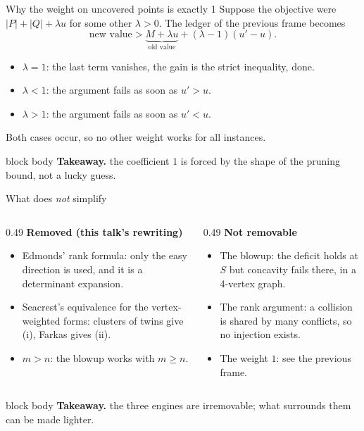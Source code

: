 \documentclass[aspectratio=169,11pt]{beamer}
\newcommand{\takeaway}[1]{%
  \vfill
  \begin{beamercolorbox}[wd=\dimexpr\textwidth-9pt\relax,sep=4pt,rounded=true]{block body}
    \footnotesize\color{mainblue}\textbf{Takeaway.} \color{black}#1
  \end{beamercolorbox}}
\begin{document}
\begin{frame}{Why the weight on uncovered points is exactly 1}
  \small
  Suppose the objective were $|P|+|Q|+\lambda u$ for some other $\lambda>0$. The ledger of the
  previous frame becomes
  \[
    \text{new value} > \underbrace{M+\lambda u}_{\text{old value}}+(\lambda-1)(u'-u).
  \]
  \medskip
  \begin{itemize}
    \item $\lambda=1$: the last term vanishes, the gain is the strict inequality, done.
    \item $\lambda<1$: the argument fails as soon as $u'>u$.
    \item $\lambda>1$: the argument fails as soon as $u'<u$.
  \end{itemize}
  \medskip
  Both cases occur, so no other weight works for all instances.
  \takeaway{the coefficient $1$ is forced by the shape of the pruning bound, not a lucky guess.}
\end{frame}

\begin{frame}{What does \emph{not} simplify}
  \small
  \begin{columns}[T]
  \begin{column}{0.49\textwidth}
    \textbf{Removed (this talk's rewriting)}
    \begin{itemize}
      \item Edmonds' rank formula: only the easy direction is used, and it is a determinant
        expansion.
      \item Seacrest's equivalence for the vertex-weighted forms: clusters of twins give (i),
        Farkas gives (ii).
      \item $m>n$: the blowup works with $m\ge n$.
    \end{itemize}
  \end{column}
  \begin{column}{0.49\textwidth}
    \textbf{Not removable}
    \begin{itemize}
      \item The blowup: the deficit holds at $S$ but concavity fails there, in a 4-vertex graph.
      \item The rank argument: a collision is shared by many conflicts, so no injection exists.
      \item The weight $1$: see the previous frame.
    \end{itemize}
  \end{column}
  \end{columns}
  \takeaway{the three engines are irremovable; what surrounds them can be made lighter.}
\end{frame}
\end{document}
